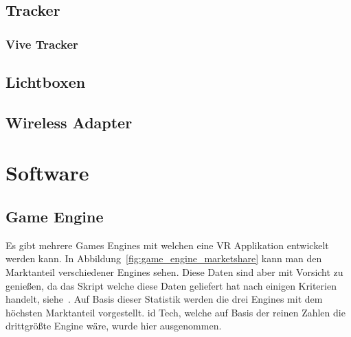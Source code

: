 \subsection{Tracker}\label{sec:tracker}

\subsubsection{Vive Tracker}\label{sec:vive-tracker}

\subsection{Lichtboxen}\label{sec:lighthouse}

\subsection{Wireless Adapter }

\section{Software}

\subsection{Game Engine}

Es gibt mehrere Games Engines mit welchen eine VR Applikation entwickelt werden kann.
In Abbildung~\ref{fig:game_engine_marketshare} kann man den Marktanteil verschiedener Engines sehen.
Diese Daten sind aber mit Vorsicht zu genießen, da das Skript welche diese Daten geliefert hat nach einigen Kriterien handelt, siehe~\cite{REDDIT_2018}.
Auf Basis dieser Statistik werden die drei Engines mit dem höchsten Marktanteil vorgestellt.
id Tech, welche auf Basis der reinen Zahlen die drittgrößte Engine wäre, wurde hier ausgenommen.

